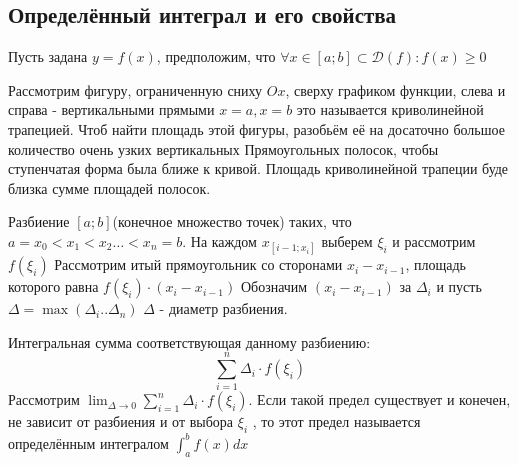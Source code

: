 \documentclass[oneside]{book}
\begin{document}
\begin{enumerate}
\begin{itemize}
\begin{enumerate}
\setcounter{chapter}{34} %
\chapter[Определённый интеграл]{Определённый интеграл и его свойства}
Пусть задана $y = f(x)$, предположим, что $\forall x \in [a;b] \subset \mathcal{D}(f): f(x) \geq 0$
\begin{center}
   {\pgfqpoint{-1pt}{-1pt}}%
   {\pgfqpoint{10pt}{10pt}}%
   {\pgfqpoint{9pt}{9pt}}%
   {
     \pgfsetlinewidth{0.4pt}
     \pgfpathmoveto{\pgfqpoint{0pt}{0pt}}
     \pgfpathlineto{\pgfqpoint{9.1pt}{9.1pt}}
    }
    \end{center}

Рассмотрим фигуру, ограниченную сниху $Ox$, сверху графиком функции, слева и справа - вертикальными прямыми
$x = a, x = b$ это называется криволинейной трапецией. Чтоб найти площадь этой фигуры, разобьём её на досаточно
большое количество очень узких вертикальных Прямоугольных полосок, чтобы ступенчатая форма была ближе к кривой. Площадь криволинейной
трапеции буде близка сумме площадей полосок.
\par Разбиение $[a;b]$(конечное множество точек) таких, что $a = x_0 <x_1 < x_2 \dots < x_n = b$. На каждом $x_{[i-1;x_i]}$
выберем $\xi_i$ и рассмотрим $f(\xi_i)$ Рассмотрим итый прямоугольник со сторонами $x_i - x_{i-1}$, площадь которого равна
$f(\xi_i)\cdot (x_i - x_{i-1})$ Обозначим $(x_i - x_{i-1})$ за $\Delta_i$ и пусть $\Delta = \max(\Delta_i .. \Delta_n)$
$\Delta$ - диаметр разбиения.
\par Интегральная сумма соответствующая данному разбиению: $$
  \sum_{i = 1}^n \Delta_i \cdot f(\xi_i)
$$
Рассмотрим $\lim_{\Delta \rightarrow 0}{\sum_{i = 1}^n \Delta_i \cdot f(\xi_i)} $. Если такой предел существует и конечен, не зависит от
разбиения и от выбора $\xi_i$ , то этот предел называется определённым интегралом $\int_{a}^b f(x) dx$



\end{enumerate}
\end{itemize}
\end{enumerate}
\end{document}
